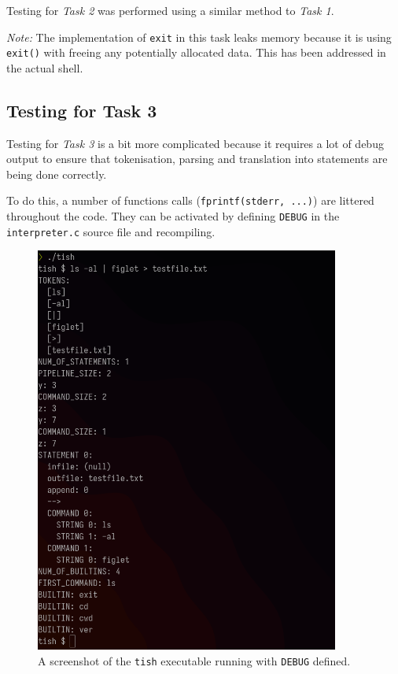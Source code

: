 \documentclass[12pt]{article}
\begin{document}
Testing for \textit{Task 2} was performed using a similar method
to \textit{Task 1}.

\textit{Note:} The implementation of \texttt{exit} in this task
leaks memory because it is using \texttt{exit()} with freeing
any potentially allocated data. This has been addressed in the
actual shell.

\subsection{Testing for Task 3}

Testing for \textit{Task 3} is a bit more complicated because it
requires a lot of debug output to ensure that tokenisation,
parsing and translation into statements are being done
correctly.

\newpage





To do this, a number of functions calls (\texttt{fprintf(stderr,
...)}) are littered throughout the code. They can be activated
by defining \texttt{DEBUG} in the \texttt{interpreter.c} source
file and recompiling.

\begin{figure}[H]
\centering
\includegraphics[width=10cm]{task3and4-test}
\caption{A screenshot of the \texttt{tish} executable running
with \texttt{DEBUG} defined.}
\end{figure}
\end{document}
